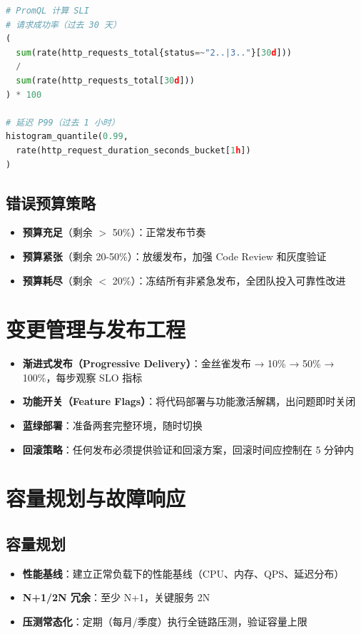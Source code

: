 \documentclass[12pt,UTF8]{ctexbook}
\begin{document}
\begin{lstlisting}[language=python]
# PromQL 计算 SLI
# 请求成功率（过去 30 天）
(
  sum(rate(http_requests_total{status=~"2..|3.."}[30d]))
  /
  sum(rate(http_requests_total[30d]))
) * 100

# 延迟 P99（过去 1 小时）
histogram_quantile(0.99,
  rate(http_request_duration_seconds_bucket[1h])
)
\end{lstlisting}

\subsection*{错误预算策略}

\begin{itemize}
    \item \textbf{预算充足}（剩余 $>$ 50\%）：正常发布节奏
    \item \textbf{预算紧张}（剩余 20-50\%）：放缓发布，加强 Code Review 和灰度验证
    \item \textbf{预算耗尽}（剩余 $<$ 20\%）：冻结所有非紧急发布，全团队投入可靠性改进
\end{itemize}

\section{变更管理与发布工程}
\label{sec:sre-release}

\begin{itemize}
    \item \textbf{渐进式发布（Progressive Delivery）}：金丝雀发布 → 10\% → 50\% → 100\%，每步观察 SLO 指标
    \item \textbf{功能开关（Feature Flags）}：将代码部署与功能激活解耦，出问题即时关闭
    \item \textbf{蓝绿部署}：准备两套完整环境，随时切换
    \item \textbf{回滚策略}：任何发布必须提供验证和回滚方案，回滚时间应控制在 5 分钟内
\end{itemize}

\section{容量规划与故障响应}
\label{sec:sre-capacity}

\subsection*{容量规划}

\begin{itemize}
    \item \textbf{性能基线}：建立正常负载下的性能基线（CPU、内存、QPS、延迟分布）
    \item \textbf{N+1/2N 冗余}：至少 N+1，关键服务 2N
    \item \textbf{压测常态化}：定期（每月/季度）执行全链路压测，验证容量上限
\end{itemize}
\end{document}
